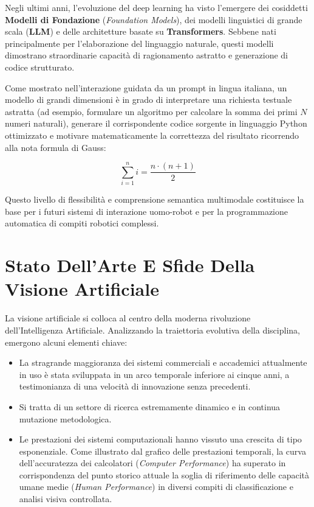 ﻿\documentclass[11pt, a4paper]{article}
\begin{document}
Negli ultimi anni, l'evoluzione del deep learning ha visto l'emergere dei cosiddetti \textbf{Modelli di Fondazione} (\emph{Foundation Models}), dei modelli linguistici di grande scala (\textbf{LLM}) e delle architetture basate su \textbf{Transformers}. Sebbene nati principalmente per l'elaborazione del linguaggio naturale, questi modelli dimostrano straordinarie capacità di ragionamento astratto e generazione di codice strutturato.

Come mostrato nell'interazione guidata da un prompt in lingua italiana, un modello di grandi dimensioni è in grado di interpretare una richiesta testuale astratta (ad esempio, formulare un algoritmo per calcolare la somma dei primi $N$ numeri naturali), generare il corrispondente codice sorgente in linguaggio Python ottimizzato e motivare matematicamente la correttezza del risultato ricorrendo alla nota formula di Gauss:

\[
\sum_{i=1}^{n} i = \frac{n \cdot (n+1)}{2}
\]

Questo livello di flessibilità e comprensione semantica multimodale costituisce la base per i futuri sistemi di interazione uomo-robot e per la programmazione automatica di compiti robotici complessi.


\newpage

\section{Stato Dell'Arte E Sfide Della Visione Artificiale}

La visione artificiale si colloca al centro della moderna rivoluzione dell'Intelligenza Artificiale. Analizzando la traiettoria evolutiva della disciplina, emergono alcuni elementi chiave:
\begin{itemize}[noitemsep]
    \item La stragrande maggioranza dei sistemi commerciali e accademici attualmente in uso è stata sviluppata in un arco temporale inferiore ai cinque anni, a testimonianza di una velocità di innovazione senza precedenti.
    \item Si tratta di un settore di ricerca estremamente dinamico e in continua mutazione metodologica.
    \item Le prestazioni dei sistemi computazionali hanno vissuto una crescita di tipo esponenziale. Come illustrato dal grafico delle prestazioni temporali, la curva dell'accuratezza dei calcolatori (\emph{Computer Performance}) ha superato in corrispondenza del punto storico attuale la soglia di riferimento delle capacità umane medie (\emph{Human Performance}) in diversi compiti di classificazione e analisi visiva controllata.
\end{itemize}
\end{document}
